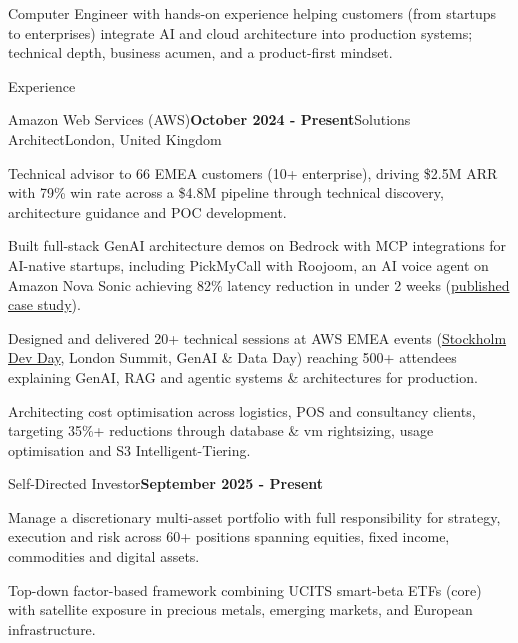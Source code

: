 \documentclass[11pt]{resume}
\begin{document}
\begin{center}
Computer Engineer with hands-on experience helping customers (from startups to enterprises) integrate AI and cloud architecture into production systems; technical depth, business acumen, and a product-first mindset.
\end{center}

\begin{rSection}{Experience}

    \begin{rSubsection}{Amazon Web Services (AWS)}{\textbf{October 2024 - Present}}{Solutions Architect}{London, United Kingdom}
    \item Technical advisor to 66 EMEA customers (10+ enterprise), driving \$2.5M ARR with 79\% win rate across a \$4.8M pipeline through technical discovery, architecture guidance and POC development.
    \item Built full-stack GenAI architecture demos on Bedrock with MCP integrations for AI-native startups, including PickMyCall with Roojoom, an AI voice agent on Amazon Nova Sonic achieving 82\% latency reduction in under 2 weeks (\href{https://aws.amazon.com/solutions/case-studies/roojoom-case-study/}{published case study}).
    \item Designed and delivered 20+ technical sessions at AWS EMEA events (\href{https://www.linkedin.com/pulse/aws-dev-day-engineering-mindset-age-ai-dataquant-weekly-bilal-maqsood-kj2mf/?trackingId=JKMGQRz9Rpeup4AwQs6dNw%3D%3D#:~:text=4.%20Zero%20to,Yago%20Tobio%20Souto}{Stockholm Dev Day}, London Summit, GenAI \& Data Day) reaching 500+ attendees explaining GenAI, RAG and agentic systems \& architectures for production.
    \item Architecting cost optimisation across logistics, POS and consultancy clients, targeting 35\%+ reductions through database \& vm rightsizing, usage optimisation and S3 Intelligent-Tiering.
    \end{rSubsection}

    \begin{rSubsection}{Self-Directed Investor}{\textbf{September 2025 - Present}}{}{}
    \item Manage a discretionary multi-asset portfolio with full responsibility for strategy, execution and risk across 60+ positions spanning equities, fixed income, commodities and digital assets.
    \item Top-down factor-based framework combining UCITS smart-beta ETFs (core) with satellite exposure in precious metals, emerging markets, and European infrastructure.
    \end{rSubsection}


\end{rSection}
\end{document}
